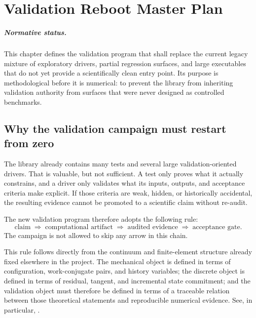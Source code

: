 
\chapter{Validation Reboot Master Plan}
\label{ch:validation-reboot-master-plan}

\paragraph{Normative status.}
This chapter defines the validation program that shall replace the current
legacy mixture of exploratory drivers, partial regression surfaces, and
large executables that do not yet provide a scientifically clean entry point.
Its purpose is methodological before it is numerical: to prevent the library
from inheriting validation authority from surfaces that were never designed as
controlled benchmarks.

\section{Why the validation campaign must restart from zero}

The library already contains many tests and several large validation-oriented
drivers.  That is valuable, but not sufficient.  A test only proves what it
actually constrains, and a driver only validates what its inputs, outputs, and
acceptance criteria make explicit.  If those criteria are weak, hidden, or
historically accidental, the resulting evidence cannot be promoted to a
scientific claim without re-audit.

The new validation program therefore adopts the following rule:
\begin{equation}
  \text{claim}
  \;\Longrightarrow\;
  \text{computational artifact}
  \;\Longrightarrow\;
  \text{audited evidence}
  \;\Longrightarrow\;
  \text{acceptance gate}.
\end{equation}
The campaign is not allowed to skip any arrow in this chain.

This rule follows directly from the continuum and finite-element structure
already fixed elsewhere in the project.  The mechanical object is defined in
terms of configuration, work-conjugate pairs, and history variables; the
discrete object is defined in terms of residual, tangent, and incremental state
commitment; and the validation object must therefore be defined in terms of a
traceable relation between those theoretical statements and reproducible
numerical evidence.  See, in particular,
\cite{BonetWood2008,Crisfield1991_NLFEA_Vol1,DeBorst2012_NonlinearFEM}.

